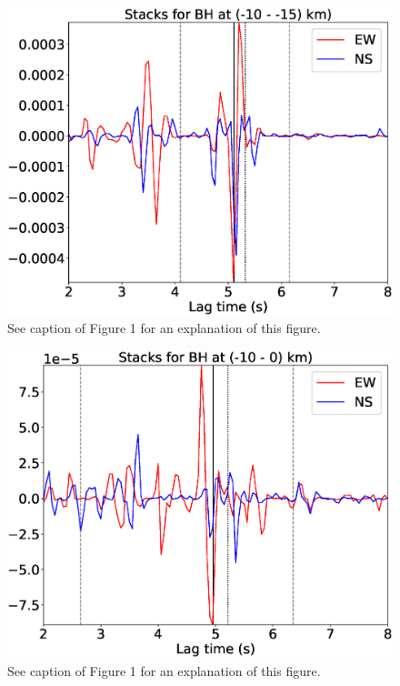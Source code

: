\documentclass[letterpaper, 12pt]{article}
\begin{document}
\begin{figure}[H]
\includegraphics[width=\linewidth]{figures/intervals/BH_-10_-15_stacks.eps}
\caption{See caption of Figure 1 for an explanation of this figure.}
\end{figure}

\begin{figure}[H]
\includegraphics[width=\linewidth]{figures/intervals/BH_-10_000_stacks.eps}
\caption{See caption of Figure 1 for an explanation of this figure.}
\end{figure}
\end{document}
